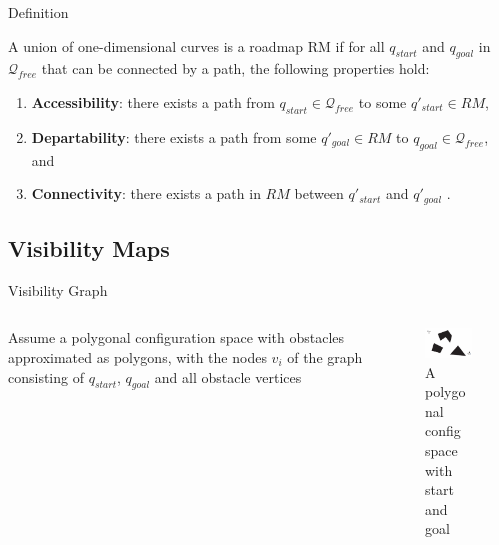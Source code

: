 \documentclass[handout]{beamer}
\begin{document}
  \begin{frame}{Definition}
    
    A union of one-dimensional curves is a roadmap RM if for all $q_{start}$ and $q_{goal}$ in $\mathcal{Q}_{free}$ that can be connected by a path, the following properties hold:
    \begin{enumerate}
      \item \textbf{Accessibility}: there exists a path from $q_{start} \in \mathcal{Q}_{free}$ to some $q'_{start}  \in RM$,
      \item \textbf{Departability}: there exists a path from some $q'_{goal} \in RM$ to $q_{goal} \in \mathcal{Q}_{free}$, and
      \item \textbf{Connectivity}: there exists a path in $RM$ between $q'_{start}$  and $q'_{goal}$   .
    \end{enumerate}

  \end{frame}

  \subsection[Visibility Maps]{Visibility Maps}

  \begin{frame}{Visibility Graph}

    \begin{columns}
      \begin{column}[]{0.4\textwidth}
        Assume a polygonal configuration space with obstacles approximated as polygons, with the nodes $v_{i}$ of the graph consisting of $q_{start}$, $q_{goal}$ and all obstacle vertices
      \end{column}
      \begin{column}[]{0.6\textwidth}
        \begin{center}
        \begin{figure}
          \includegraphics[width=60mm]{fig/fig_02_poly_cofig_space.png}
          \caption{A polygonal config space with start and goal}
          \label{fig:fig02}
        \end{figure}
       \end{center}
      \end{column}
    \end{columns}
    
  \end{frame}
\end{document}
